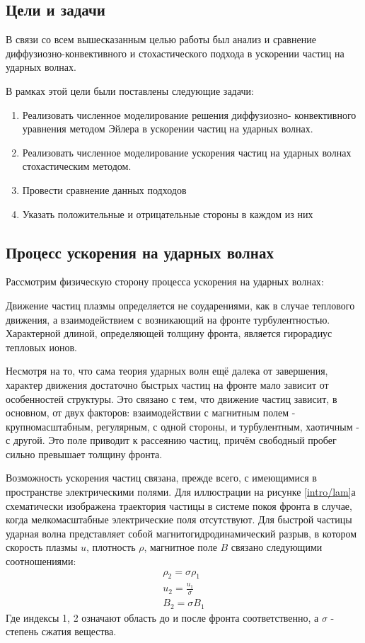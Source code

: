 \documentclass[a4paper,14pt]{extarticle} %
\begin{document}
\subsection{Цели и задачи}
В связи со всем вышесказанным целью работы был анализ и сравнение \\
диффузиозно-конвективного и стохастического подхода в ускорении частиц на ударных волнах.

В рамках этой цели были поставлены следующие задачи:
\begin{enumerate}
\item Реализовать численное моделирование решения диффузиозно- конвективного уравнения методом Эйлера в ускорении частиц на ударных волнах.
\item Реализовать численное моделирование ускорения частиц на ударных волнах стохастическим методом.
\item Провести сравнение данных подходов
\item Указать положительные и отрицательные стороны в каждом из них
\end{enumerate}

\subsection{Процесс ускорения на ударных волнах}
Рассмотрим физическую сторону процесса ускорения на ударных волнах\cite{berezhko}:

Движение частиц плазмы определяется не соударениями, как в случае теплового движения, а взаимодействием с возникающий на фронте турбулентностью. Характерной длиной, определяющей толщину фронта, является гирорадиус тепловых ионов.

Несмотря на то, что сама теория ударных волн ещё далека от завершения, характер движения достаточно быстрых частиц на фронте мало зависит от особенностей структуры. Это связано с тем, что движение частиц зависит, в основном, от двух факторов: взаимодействии с магнитным полем - крупномасштабным, регулярным, с одной стороны, и турбулентным, хаотичным - с другой. Это поле приводит к рассеянию частиц, причём свободный пробег сильно превышает толщину фронта.

Возможность ускорения частиц связана, прежде всего, с имеющимися в пространстве электрическими полями. Для иллюстрации на рисунке \ref{intro/lam}а схематически изображена траектория частицы в системе покоя фронта в случае, когда мелкомасштабные электрические поля отсутствуют. Для быстрой частицы ударная волна представляет собой магнитогидродинамический разрыв, в котором скорость плазмы $u$, плотность $\rho$, магнитное поле $B$ связано следующими соотношениями:
\begin{eqnarray}
\rho_2 = \sigma \rho_1\\
u_2=\frac{u_1}{\sigma}\\
B_2=\sigma B_1
\end{eqnarray}
Где индексы 1, 2 означают область до и после фронта соответственно, а $\sigma$ - степень сжатия вещества.
\end{document}
